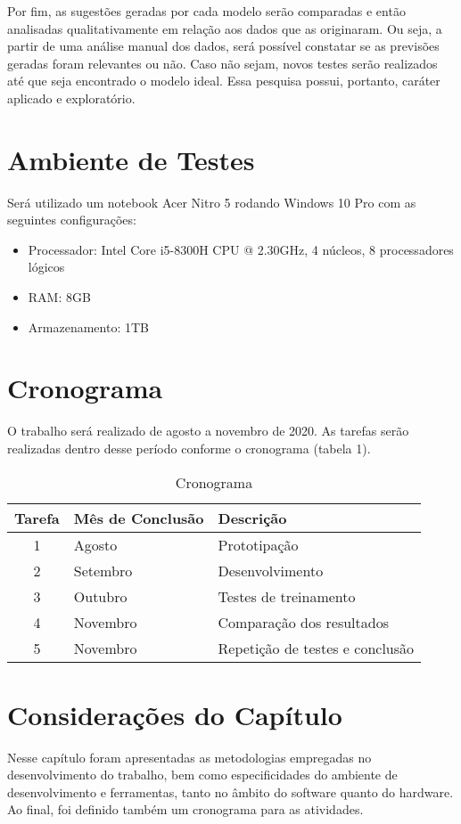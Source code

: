 Por fim, as sugestões geradas por cada modelo serão comparadas e então analisadas qualitativamente em relação aos dados que as originaram. Ou seja, a partir de uma análise manual dos dados, será possível constatar se as previsões geradas foram relevantes ou não. Caso não sejam, novos testes serão realizados até que seja encontrado o modelo ideal. Essa pesquisa possui, portanto, caráter aplicado e exploratório.

\section{Ambiente de Testes}
Será utilizado um notebook Acer Nitro 5 rodando Windows 10 Pro com as seguintes configurações:
\begin{itemize}
    \item Processador: Intel Core i5-8300H CPU @ 2.30GHz, 4 núcleos, 8 processadores lógicos
    \item RAM: 8GB
    \item Armazenamento: 1TB
\end{itemize}

\section{Cronograma}
O trabalho será realizado de agosto a novembro de 2020. As tarefas serão realizadas dentro desse período conforme o cronograma (tabela 1).

\begin{table}[ht]
\centering
\begin{tabular}{|c|l|l|}
\hline
\textbf{Tarefa} & \textbf{Mês de Conclusão} & \textbf{Descrição}\\
\hline
1              & Agosto             & Prototipação \\
2              & Setembro              & Desenvolvimento \\
3              & Outubro              & Testes de treinamento  \\
4              & Novembro              & Comparação dos resultados            \\
5              & Novembro              & Repetição de testes e conclusão     \\
\hline
\end{tabular}
\caption{Cronograma}
\end{table}

\section{Considerações do Capítulo}
Nesse capítulo foram apresentadas as metodologias empregadas no desenvolvimento do trabalho, bem como especificidades do ambiente de desenvolvimento e ferramentas, tanto no âmbito do software quanto do hardware. Ao final, foi definido também um cronograma para as atividades.


